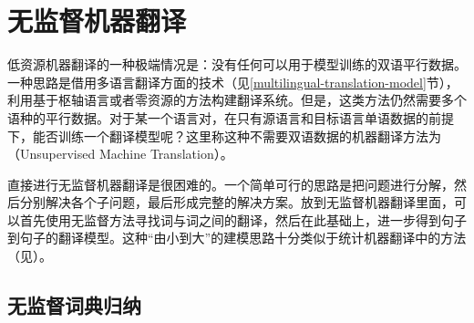 
\section{无监督机器翻译}
\label{sec:unsupervised-nmt}

\parinterval 低资源机器翻译的一种极端情况是：没有任何可以用于模型训练的双语平行数据。一种思路是借用多语言翻译方面的技术（见\ref{multilingual-translation-model}节），利用基于枢轴语言或者零资源的方法构建翻译系统。但是，这类方法仍然需要多个语种的平行数据。对于某一个语言对，在只有源语言和目标语言单语数据的前提下，能否训练一个翻译模型呢？这里称这种不需要双语数据的机器翻译方法为{\small{}}（Unsupervised Machine Translation）。

\parinterval 直接进行无监督机器翻译是很困难的。一个简单可行的思路是把问题进行分解，然后分别解决各个子问题，最后形成完整的解决方案。放到无监督机器翻译里面，可以首先使用无监督方法寻找词与词之间的翻译，然后在此基础上，进一步得到句子到句子的翻译模型。这种“由小到大”的建模思路十分类似于统计机器翻译中的方法（见\chapterseven）。



\subsection{无监督词典归纳}\label{unsupervised-dictionary-induction}

